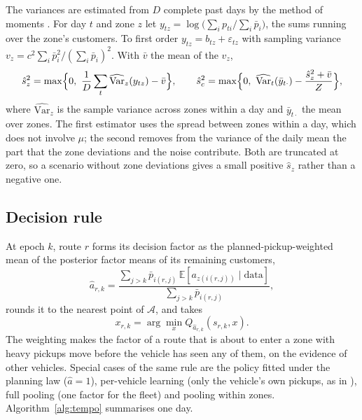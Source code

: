 \documentclass[preprint,authoryear,12pt]{elsarticle}
\newcommand{\E}{\mathbb{E}}
\begin{document}
The variances are estimated from $D$ complete past days by the method
of moments \citep{morris1983peb}. For day $t$ and zone $z$ let
$y_{tz} = \log\bigl(\sum_i p_{ti} / \sum_i \bar p_i\bigr)$, the sums
running over the zone's customers. To first order $y_{tz} = b_{tz} +
\varepsilon_{tz}$ with sampling variance $v_z = c^2 \sum_i \bar p_i^2 /
(\sum_i \bar p_i)^2$. With $\bar v$ the mean of the $v_z$,
\begin{equation}\label{eq:mom}
\hat s_z^2 = \max\Bigl\{0,\ \frac1D \sum_t \widehat{\mathrm{Var}}_z(y_{tz})
- \bar v\Bigr\},
\qquad
\hat s_c^2 = \max\Bigl\{0,\ \widehat{\mathrm{Var}}_t(\bar y_{t\cdot}) -
\frac{\hat s_z^2 + \bar v}{Z}\Bigr\},
\end{equation}
where $\widehat{\mathrm{Var}}_z$ is the sample variance across zones
within a day and $\bar y_{t\cdot}$ the mean over zones. The first
estimator uses the spread between zones within a day, which does not
involve $\mu$; the second removes from the variance of the daily mean
the part that the zone deviations and the noise contribute. Both are
truncated at zero, so a scenario without zone deviations gives a small
positive $\hat s_z$ rather than a negative one.

\subsection{Decision rule}

At epoch $k$, route $r$ forms its decision factor as the
planned-pickup-weighted mean of the posterior factor means of its
remaining customers,
\begin{equation}\label{eq:decfactor}
\hat a_{r,k} = \frac{\sum_{j > k} \bar p_{i(r,j)}\,
\E[a_{z(i(r,j))} \mid \text{data}]}{\sum_{j>k} \bar p_{i(r,j)}},
\end{equation}
rounds it to the nearest point of $\mathcal{A}$, and takes
\begin{equation}\label{eq:rule}
x_{r,k} = \arg\min_x Q_{\hat a_{r,k}}(s_{r,k}, x).
\end{equation}
The weighting makes the factor of a route that is about to enter a
zone with heavy pickups move before the vehicle has seen any of them,
on the evidence of other vehicles. Special cases of the same rule are
the policy fitted under the planning law ($\hat a = 1$), per-vehicle
learning (only the vehicle's own pickups, as in
\citealp{florio2023bayesian}), full pooling (one factor for the fleet)
and pooling within zones. Algorithm~\ref{alg:tempo} summarises one day.
\end{document}
